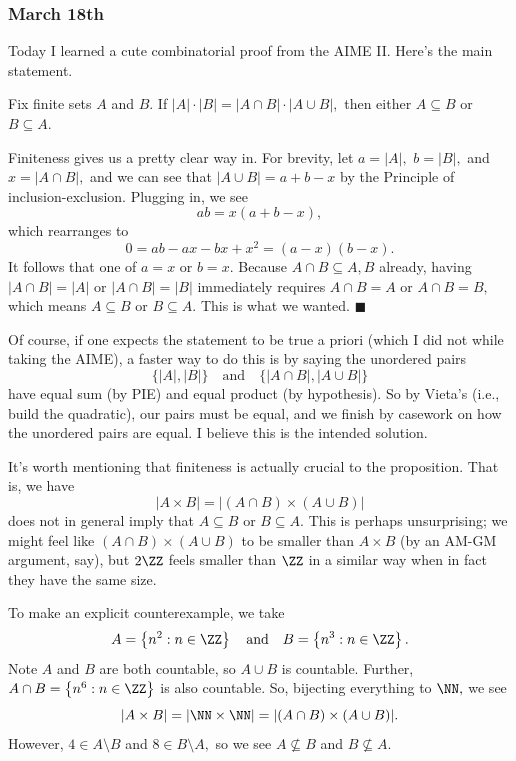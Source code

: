 \subsubsection{March 18th}
Today I learned a cute combinatorial proof from the AIME II. Here's the main statement.
\begin{proposition}
    Fix finite sets $A$ and $B.$ If $|A|\cdot|B|=|A\cap B|\cdot|A\cup B|,$ then either $A\subseteq B$ or $B\subseteq A.$
\end{proposition}
Finiteness gives us a pretty clear way in. For brevity, let $a=|A|,$ $b=|B|,$ and $x=|A\cap B|,$ and we can see that $|A\cup B|=a+b-x$ by the Principle of inclusion-exclusion. Plugging in, we see
\[ab=x(a+b-x),\]
which rearranges to
\[0=ab-ax-bx+x^2=(a-x)(b-x).\]
It follows that one of $a=x$ or $b=x.$ Because $A\cap B\subseteq A,B$ already, having $|A\cap B|=|A|$ or $|A\cap B|=|B|$ immediately requires $A\cap B=A$ or $A\cap B=B,$ which means $A\subseteq B$ or $B\subseteq A.$ This is what we wanted. $\blacksquare$

Of course, if one expects the statement to be true a priori (which I did not while taking the AIME), a faster way to do this is by saying the unordered pairs
\[\{|A|,|B|\}\quad\text{and}\quad\{|A\cap B|,|A\cup B|\}\]
have equal sum (by PIE) and equal product (by hypothesis). So by Vieta's (i.e., build the quadratic), our pairs must be equal, and we finish by casework on how the unordered pairs are equal. I believe this is the intended solution.

It's worth mentioning that finiteness is actually crucial to the proposition. That is, we have
\[|A\times B|=|(A\cap B)\times(A\cup B)|\]
does not in general imply that $A\subseteq B$ or $B\subseteq A.$ This is perhaps unsurprising; we might feel like $(A\cap B)\times(A\cup B)$ to be smaller than $A\times B$ (by an AM-GM argument, say), but $2\ZZ$ feels smaller than $\ZZ$ in a similar way when in fact they have the same size.

To make an explicit counterexample, we take
\[A=\left\{n^2:n\in\ZZ\right\}\quad\text{and}\quad B=\left\{n^3:n\in\ZZ\right\}.\]
Note $A$ and $B$ are both countable, so $A\cup B$ is countable. Further, $A\cap B=\left\{n^6:n\in\ZZ\right\}$ is also countable. So, bijecting everything to $\NN,$ we see
\[|A\times B|=|\NN\times\NN|=|(A\cap B)\times(A\cup B)|.\]
However, $4\in A\setminus B$ and $8\in B\setminus A,$ so we see $A\not\subseteq B$ and $B\not\subseteq A.$


